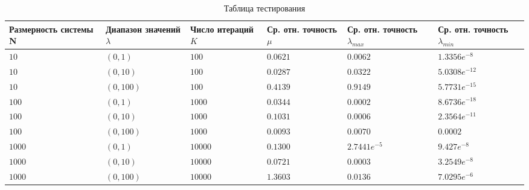 \documentclass[11pt,a4paper]{report}
\begin{document}
\begin{table}[htbp]
	
	\begin{center}
		\caption{Таблица тестирования}
		\small
		\begin{tabularx}{\linewidth}{|X|X|X|X|X|X|}
			\hline
			Размерность системы N & Диапазон значений $\lambda$ & Число итераций $K$ & Ср. отн. точность $\mu$ & Ср. отн. точность $\lambda_{max}$ & Ср. отн. точность $\lambda_{min}$ \\
			\hline
			$10$ & $(0,1)$ & $100$& $0.0621$ & $0.0062$ & $1.3356e^{-8}$\\
			\hline
			$10$ & $(0,10)$ & $100$& $0.0287$ & $0.0322$ & $5.0308e^{-12}$\\
			\hline
			$10$ & $(0,100)$ & $100$& $0.4139$ & $0.9149$ & $5.7731e^{-15}$\\
			\hline
			$100$ & $(0,1)$ & $1000$& $0.0344$ & $0.0002$ & $8.6736e^{-18}$\\
			\hline
			$100$ & $(0,10)$ & $1000$& $0.1031$ & $0.0006$ & $2.3564e^{-11}$\\
			\hline
			$100$ & $(0,100)$ & $1000$& $0.0093$ & $0.0070$ & $0.0002$\\
			\hline
			$1000$ & $(0,1)$ & $10000$& $0.1300$ & $2.7441e^{-5}$ & $9.427e^{-8}$\\
			\hline
			$1000$ & $(0,10)$ & $10000$& $0.0721$ & $0.0003$ & $3.2549e^{-8}$\\
			\hline
			$1000$ & $(0,100)$ & $10000$& $1.3603$ & $0.0136$ & $7.0295e^{-6}$\\
			\hline
		\end{tabularx}	
	\end{center}
\end{table}
\end{document}
